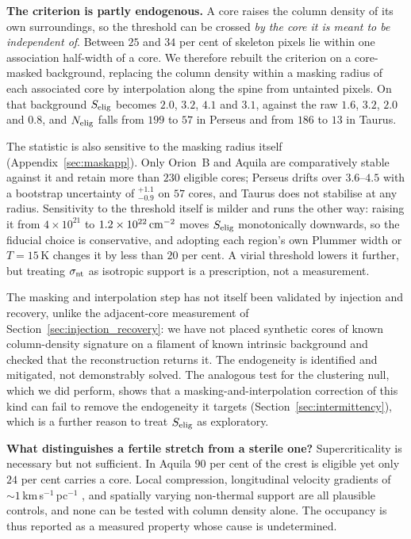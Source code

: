 \documentclass[usenatbib,twoside,twocolumn]{mnras}
\begin{document}
\smallskip\noindent\textbf{The criterion is partly endogenous.} A core raises the column density of its own surroundings, so the threshold can be crossed \emph{by the core it is meant to be independent of}. Between $25$ and $34$ per cent of skeleton pixels lie within one association half-width of a core. We therefore rebuilt the criterion on a core-masked background, replacing the column density within a masking radius of each associated core by interpolation along the spine from untainted pixels. On that background $S_{\rm elig}$ becomes $2.0$, $3.2$, $4.1$ and $3.1$, against the raw $1.6$, $3.2$, $2.0$ and $0.8$, and $N_{\rm elig}$ falls from $199$ to $57$ in Perseus and from $186$ to $13$ in Taurus.

The statistic is also sensitive to the masking radius itself (Appendix~\ref{sec:maskapp}). Only Orion~B and Aquila are comparatively stable against it and retain more than $230$ eligible cores; Perseus drifts over $3.6$--$4.5$ with a bootstrap uncertainty of $^{+1.1}_{-0.9}$ on $57$ cores, and Taurus does not stabilise at any radius. Sensitivity to the threshold itself is milder and runs the other way: raising it from $4\times10^{21}$ to $1.2\times10^{22}\,{\rm cm^{-2}}$ moves $S_{\rm elig}$ monotonically downwards, so the fiducial choice is conservative, and adopting each region's own Plummer width or $T=15$\,K changes it by less than $20$ per cent. A virial threshold lowers it further, but treating $\sigma_{\rm nt}$ as isotropic support is a prescription, not a measurement.

The masking and interpolation step has not itself been validated by injection and recovery, unlike the adjacent-core measurement of Section~\ref{sec:injection_recovery}: we have not placed synthetic cores of known column-density signature on a filament of known intrinsic background and checked that the reconstruction returns it. The endogeneity is identified and mitigated, not demonstrably solved. The analogous test for the clustering null, which we did perform, shows that a masking-and-interpolation correction of this kind can fail to remove the endogeneity it targets (Section~\ref{sec:intermittency}), which is a further reason to treat $S_{\rm elig}$ as exploratory.

\smallskip\noindent\textbf{What distinguishes a fertile stretch from a sterile one?} Supercriticality is necessary but not sufficient. In Aquila $90$ per cent of the crest is eligible yet only $24$ per cent carries a core. Local compression, longitudinal velocity gradients of $\sim1$\,km\,s$^{-1}$\,pc$^{-1}$ \citep{Kirk2013,Hacar2013}, and spatially varying non-thermal support are all plausible controls, and none can be tested with column density alone. The occupancy is thus reported as a measured property whose cause is undetermined.
\end{document}
